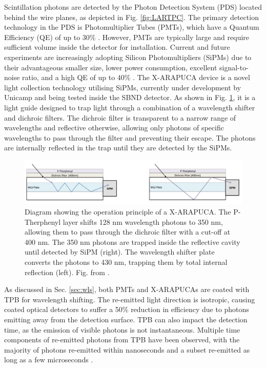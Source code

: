 Scintillation photons are detected by the Photon Detection System (PDS) located behind the wire planes, as depicted in Fig. \ref{fig:LARTPC}. 
The primary detection technology in the PDS is Photomultiplier Tubes (PMTs), which have a Quantum Efficiency (QE) of up to 30\% \cite{pmt_qe}.
However, PMTs are typically large and require sufficient volume inside the detector for installation. 
Current and future experiments are increasingly adopting Silicon Photomultipliers (SiPMs) due to their advantageous smaller size, lower power consumption, excellent signal-to-noise ratio, and a high QE of up to 40\% \cite{sipm_qe}.
The X-ARAPUCA device is a novel light collection technology utilising SiPMs, currently under development by Unicamp \cite{xarapuca} and being tested inside the SBND detector.
As shown in Fig. \ref{fig:xarapuca}, it is a light guide designed to trap light through a combination of a wavelength shifter and dichroic filters.
The dichroic filter is transparent to a narrow range of wavelengths and reflective otherwise, allowing only photons of specific wavelengths to pass through the filter and preventing their escape.
The photons are internally reflected in the trap until they are detected by the SiPMs.

\begin{figure}[htbp] 
\centering    
\includegraphics[width=1.0\textwidth]{xarapuca}
\caption[xarapuca]{
Diagram showing the operation principle of a X-ARAPUCA. 
The P-Therphenyl layer shifts 128 nm wavelength photons to 350 nm, allowing them to pass through the dichroic filter with a cut-off at 400 nm.
The 350 nm photons are trapped inside the reflective cavity until detected by SiPM (right).
The wavelength shifter plate converts the photons to 430 nm, trapping them by total internal reflection (left).
Fig. from \cite{xarapuca}.
\hfill
\break
}
\label{fig:xarapuca}
\end{figure}

As discussed in Sec. \ref{sec:wls}, both PMTs and X-ARAPUCAs are coated with TPB for wavelength shifting.
The re-emitted light direction is isotropic, causing coated optical detectors to suffer a 50\% reduction in efficiency due to photons emitting away from the detection surface.
TPB can also impact the detection time, as the emission of visible photons is not instantaneous.
Multiple time components of re-emitted photons from TPB have been observed, with the majority of photons re-emitted within nanoseconds and a subset re-emitted as long as a few microseconds \cite{tpb_time}.

